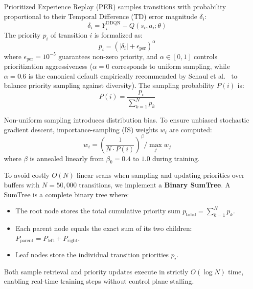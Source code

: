\documentclass[12pt,a4paper,oneside]{report}
\begin{document}
Prioritized Experience Replay (PER) \cite{schaul2016prioritized} samples transitions with probability proportional to their Temporal Difference (TD) error magnitude $\delta_i$:
\begin{equation}
\delta_i = Y_i^{\text{DDQN}} - Q(s_i, a_i; \theta)
\end{equation}
The priority $p_i$ of transition $i$ is formalized as:
\begin{equation}
p_i = \left( |\delta_i| + \epsilon_{\text{per}} \right)^\alpha
\end{equation}
where $\epsilon_{\text{per}} = 10^{-5}$ guarantees non-zero priority, and $\alpha \in [0, 1]$ controls prioritization aggressiveness ($\alpha = 0$ corresponds to uniform sampling, while $\alpha = 0.6$ is the canonical default empirically recommended by Schaul et al.~\cite{schaul2016prioritized} to balance priority sampling against diversity). The sampling probability $P(i)$ is:
\begin{equation}
P(i) = \frac{p_i}{\sum_{k=1}^N p_k}
\end{equation}

Non-uniform sampling introduces distribution bias. To ensure unbiased stochastic gradient descent, importance-sampling (IS) weights $w_i$ are computed:
\begin{equation}
w_i = \left( \frac{1}{N \cdot P(i)} \right)^\beta \Big/ \max_{j} w_j
\end{equation}
where $\beta$ is annealed linearly from $\beta_0 = 0.4$ to $1.0$ during training.

To avoid costly $O(N)$ linear scans when sampling and updating priorities over buffers with $N = 50,000$ transitions, we implement a \textbf{Binary SumTree}. A SumTree is a complete binary tree where:
\begin{itemize}
    \item The root node stores the total cumulative priority sum $p_{\text{total}} = \sum_{k=1}^N p_k$.
    \item Each parent node equals the exact sum of its two children: $P_{\text{parent}} = P_{\text{left}} + P_{\text{right}}$.
    \item Leaf nodes store the individual transition priorities $p_i$.
\end{itemize}
Both sample retrieval and priority updates execute in strictly $O(\log N)$ time, enabling real-time training steps without control plane stalling.

\end{document}
